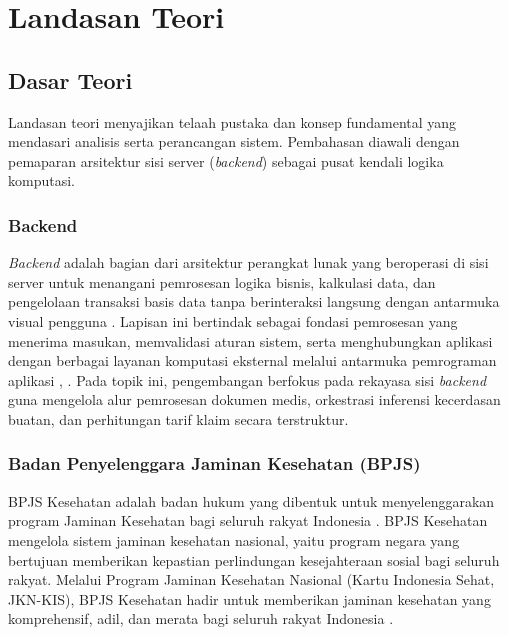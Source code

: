 \chapter{Landasan Teori}

\section{Dasar Teori}
Landasan teori menyajikan telaah pustaka dan konsep fundamental yang mendasari analisis serta perancangan sistem. Pembahasan diawali dengan pemaparan arsitektur sisi server (\textit{backend}) sebagai pusat kendali logika komputasi.

\subsection{Backend}
\textit{Backend} adalah bagian dari arsitektur perangkat lunak yang beroperasi di sisi server untuk menangani pemrosesan logika bisnis, kalkulasi data, dan pengelolaan transaksi basis data tanpa berinteraksi langsung dengan antarmuka visual pengguna \cite{20}. Lapisan ini bertindak sebagai fondasi pemrosesan yang menerima masukan, memvalidasi aturan sistem, serta menghubungkan aplikasi dengan berbagai layanan komputasi eksternal melalui antarmuka pemrograman aplikasi \cite{19}, \cite{20}. Pada topik ini, pengembangan berfokus pada rekayasa sisi \textit{backend} guna mengelola alur pemrosesan dokumen medis, orkestrasi inferensi kecerdasan buatan, dan perhitungan tarif klaim secara terstruktur.

\subsection{Badan Penyelenggara Jaminan Kesehatan (BPJS)}
BPJS Kesehatan adalah badan hukum yang dibentuk untuk menyelenggarakan program Jaminan Kesehatan bagi seluruh rakyat Indonesia \cite{10}. BPJS Kesehatan mengelola sistem jaminan kesehatan nasional, yaitu program negara yang bertujuan memberikan kepastian perlindungan kesejahteraan sosial bagi seluruh rakyat. Melalui Program Jaminan Kesehatan Nasional (Kartu Indonesia Sehat, JKN-KIS), BPJS Kesehatan hadir untuk memberikan jaminan kesehatan yang komprehensif, adil, dan merata bagi seluruh rakyat Indonesia \cite{10}.

